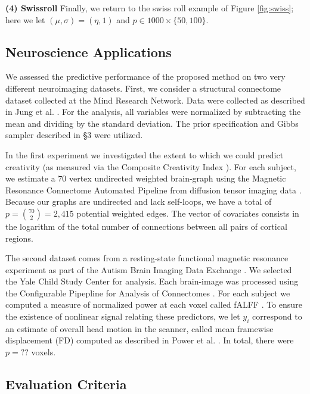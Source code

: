 \documentclass{article} %
\begin{document}
\textbf{(4) Swissroll} 
% 
Finally, we return to the swiss roll example of Figure \ref{fig:swiss}; here we let $(\mu,\sigma)=(\eta,1)$ and   $p \in 1000 \times \{50, 100\}$.



\subsection{Neuroscience Applications}

We assessed the predictive performance of the proposed method on two very different neuroimaging datasets. First, we consider a structural connectome dataset collected at the Mind Research Network.  Data were collected as described in Jung et al. \cite{Jung2010}. For the analysis, all variables were normalized by subtracting the mean and dividing by the standard deviation. The  prior specification and Gibbs sampler described in \S 3 were utilized. 

In the first experiment we investigated the extent to which we could predict creativity (as measured via the Composite Creativity Index \cite{Arden2010}).   For each subject, we estimate a $70$ vertex undirected weighted brain-graph using the Magnetic Resonance Connectome Automated Pipeline \cite{MRCAP11} from diffusion tensor imaging data \cite{Mori2006}. Because our graphs are undirected and lack self-loops, we have a total of $p=\binom{70}{2}=2,415$ potential weighted edges. The vector of covariates consists in the logarithm of the total number of connections between all pairs of cortical regions. 

The second dataset comes from a resting-state functional magnetic resonance experiment as part of the Autism Brain Imaging Data Exchange \cite{Autism}.  We selected the Yale Child Study Center for analysis.  Each brain-image was processed using the Configurable Pipepline for Analysis of Connectomes \cite{cpac}. For each subject we computed a measure of normalized power at each voxel called fALFF \cite{Zou2008}.  To ensure the existence of nonlinear signal relating these predictors, we let $y_i$ correspond to an estimate of overall head motion in the scanner, called mean framewise displacement (FD) computed as described in Power et al. \cite{power}. In total, there were $p=??$ voxels.

\subsection{Evaluation Criteria}
\end{document}
